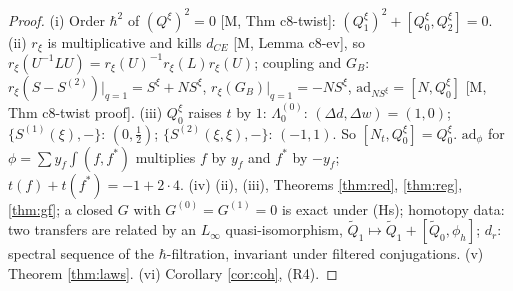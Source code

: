 \documentclass[10pt]{article}
\theoremstyle{definition}
\newcommand{\ad}{\mathrm{ad}}
\begin{document}
\begin{proof}
(i) Order $\hbar^2$ of $(Q^\xi)^2=0$ [M, Thm c8-twist]: $(Q^\xi_1)^2+[Q^\xi_0,Q^\xi_2]=0$. (ii) $r_\xi$ is multiplicative and kills $d_{CE}$ [M, Lemma c8-ev], so $r_\xi(U^{-1}LU)=r_\xi(U)^{-1}r_\xi(L)r_\xi(U)$; coupling and $G_B$: $r_\xi(S-S^{(2)})|_{q=1}=S^\xi+NS^\xi$, $r_\xi(G_B)|_{q=1}=-NS^\xi$, $\ad_{NS^\xi}=[N,Q^\xi_0]$ [M, Thm c8-twist proof]. (iii) $Q^\xi_0$ raises $t$ by $1$: $\Lambda_0^{(0)}$: $(\Delta d,\Delta w)=(1,0)$; $\{S^{(1)}(\xi),-\}$: $(0,\tfrac12)$; $\{S^{(2)}(\xi,\xi),-\}$: $(-1,1)$. So $[N_t,Q^\xi_0]=Q^\xi_0$. $\ad_\phi$ for $\phi=\sum y_f\int(f,f^*)$ multiplies $f$ by $y_f$ and $f^*$ by $-y_f$; $t(f)+t(f^*)=-1+2\cdot4$. (iv) (ii), (iii), Theorems \ref{thm:red}, \ref{thm:reg}, \ref{thm:gf}; a closed $G$ with $G^{(0)}=G^{(1)}=0$ is exact under (Hs); homotopy data: two transfers are related by an $L_\infty$ quasi-isomorphism, $\tilde Q_1\mapsto\tilde Q_1+[\tilde Q_0,\phi_h]$; $d_r$: spectral sequence of the $\hbar$-filtration, invariant under filtered conjugations. (v) Theorem \ref{thm:laws}. (vi) Corollary \ref{cor:coh}, (R4).
\end{proof}
\end{document}
